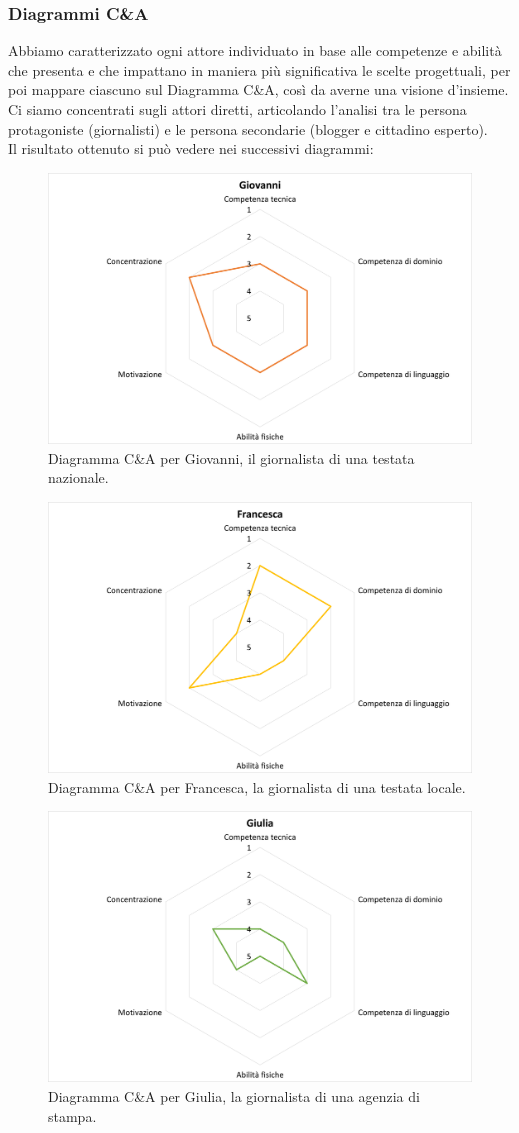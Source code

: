 \subsubsection{Diagrammi C\&A}
Abbiamo caratterizzato ogni attore individuato in base alle competenze e abilità che presenta e che impattano in maniera più significativa le scelte progettuali, per poi mappare ciascuno sul Diagramma C\&A, così da averne una visione d'insieme.
Ci siamo concentrati sugli attori diretti, articolando l'analisi tra le persona protagoniste (giornalisti) e le persona secondarie (blogger e cittadino esperto).\\
Il risultato ottenuto si può vedere nei successivi diagrammi:
\begin{figure}[H]
    \centering
    \includegraphics[width=0.5\columnwidth]{assets/images/proposta-design/caos/giovanni}
    \caption{Diagramma C\&A per Giovanni, il giornalista di una testata nazionale.}
\end{figure}

\begin{figure}[H]
    \centering
    \includegraphics[width=0.5\columnwidth]{assets/images/proposta-design/caos/francesca}
    \caption{Diagramma C\&A per Francesca, la giornalista di una testata locale.}
\end{figure}

\begin{figure}[H]
    \centering
    \includegraphics[width=0.5\columnwidth]{assets/images/proposta-design/caos/giulia}
    \caption{Diagramma C\&A per Giulia, la giornalista di una agenzia di stampa.}
\end{figure}

